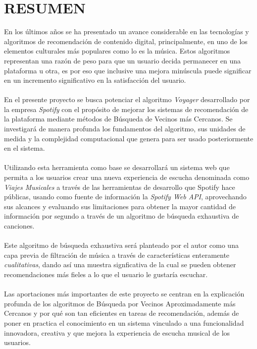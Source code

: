 \documentclass[12pt]{report}
\begin{document}
\chapter*{RESUMEN}
En los últimos años se ha presentado un avance considerable en las tecnologías y algoritmos de recomendación de contenido digital, principalmente, en uno de los elementos culturales más populares como lo es la música.
Estos algoritmos representan una razón de peso para que un usuario decida permanecer en una plataforma u otra, es por eso que inclusive una mejora minúscula puede significar en un incremento significativo en la satisfacción del usuario.
\\\\
En el presente proyecto se busca potenciar el algoritmo \textit{Voyager} desarrollado por la empresa \textit{Spotify} con el propósito de mejorar los sistemas de recomendación de la plataforma mediante métodos de Búsqueda de Vecinos más Cercanos. Se investigará de manera profunda los fundamentos del algoritmo, sus unidades de medida y la complejidad computacional que genera para ser usado posteriormente en el sistema. 
\\\\
Utilizando esta herramienta como base se desarrollará un sistema web que permita a los usuarios crear una nueva experiencia de escucha denominada como \textit{Viajes Musicales} a través de las herramientas de desarrollo que Spotify hace públicas, usando como fuente de información la \textit{Spotify Web API}, aprovechando sus alcances y evaluando sus limitaciones para obtener la mayor cantidad de información por segundo a través de un algoritmo de búsqueda exhaustiva de canciones.
\\\\
Este algoritmo de búsqueda exhaustiva será planteado por el autor como una capa previa de filtración de música a través de características enteramente \textit{cualitativas}, dando así una muestra signficativa de la cual se pueden obtener recomendaciones más fieles a lo que el usuario le gustaría escuchar.
\\\\
Las aportaciones más importantes de este proyecto se centran en la explicación profunda de los algoritmos de Búsqueda por Vecinos Aproximadamente más Cercanos y por qué son tan eficientes en tareas de recomendación, además de poner en practica el conocimiento en un sistema vinculado a una funcionalidad innovadora, creativa y que mejora la experiencia de escucha musical de los usuarios.
\end{document}
